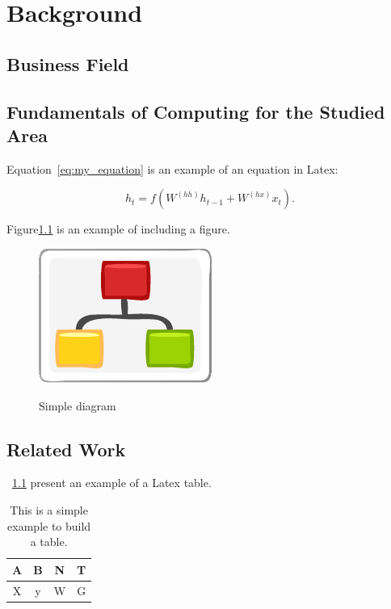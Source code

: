 
\chapter{Background}\label{chap:background}


\section{Business Field}\label{sec:business}


\section{Fundamentals of Computing for the Studied Area}\label{sec:fundamental}

Equation~\ref{eq:my_equation} is an example of an equation in Latex:

\begin{equation}\label{eq:my_equation}
    h_t = f(W^{(hh)}h_{t-1} + W^{(hx)}x_t).
\end{equation}


Figure\ref{fig:diagram} is an example of including a figure.

\begin{figure}[htb]
    \caption{Simple diagram}
    \centering
    \includegraphics[scale=1.9]{img/diagram.pdf}
    \label{fig:diagram}
\end{figure}

\cite{GRIEBLER:IJPP:18}


\cite{MACCOOL:structured_patterns:book:12}


\section{Related Work}\label{sec:rw}


\tablename~\ref{tab:my_table} present an example of a Latex table.

\begin{table}[htb]
    \caption{This is a simple example to build a table.}
    \label{tab:my_table}
    \centering
    \begin{tabular}{|c|c|c|c|}
        \hline
         A & B & N & T\\ 
         \hline
         X & y & W & G\\
         \hline
    \end{tabular}
    
\end{table}